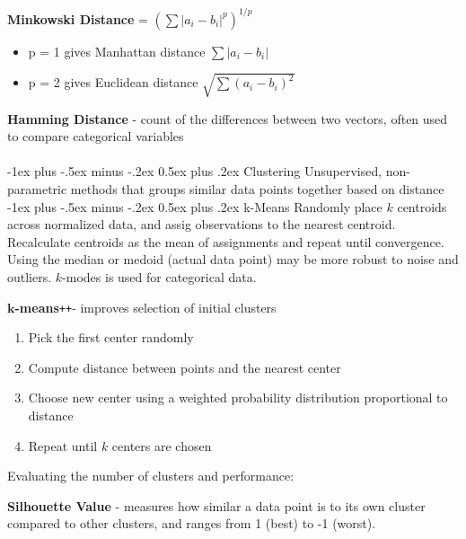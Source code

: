 \documentclass[10pt,landscape]{article}
\makeatletter
\renewcommand{\section}{\@startsection{section}{1}{0mm}%
                                {-1ex plus -.5ex minus -.2ex}%
                                {0.5ex plus .2ex}%
                                {\normalfont\large\bfseries}}
\renewcommand{\subsection}{\@startsection{subsection}{2}{0mm}%
                                {-1ex plus -.5ex minus -.2ex}%
                                {0.5ex plus .2ex}%
                                {\normalfont\normalsize\bfseries}}
\makeatother
\begin{document}
\begin{multicols}{3}
\textbf{Minkowski Distance} = $(\sum|a_i - b_i|^p)^{1/p}$
\begin{itemize}[label={--},leftmargin=4mm]
\itemsep -.4mm 
\item p = 1 gives Manhattan distance ${\sum|a_i - b_i|}$
\item p = 2 gives Euclidean distance $\sqrt{\sum(a_i - b_i)^2}$
\end{itemize}

\textbf{Hamming Distance} - count of the differences between two vectors, often used to compare categorical variables \\

\columnbreak
\textcolor{white}{.}\vspace{-5mm}\\ %
\section{Clustering}
Unsupervised, non-parametric methods that groups similar data points together based on distance
\subsection{k-Means}
Randomly place $k$ centroids across normalized data, and assig observations to the nearest centroid. Recalculate centroids as the mean of assignments and repeat until convergence. Using the median or medoid (actual data point) may be more robust to noise and outliers. $k$-modes is used for categorical data.

\def\Plus{\texttt{+}}
$\boldsymbol{k}$\textbf{-means}\Plus\Plus\hspace{1mm}- improves selection of initial clusters
\begin{enumerate}[leftmargin=5mm]
\itemsep -.4mm 
\item Pick the first center randomly
\item Compute distance between points and the nearest center
\item Choose new center using a weighted probability distribution proportional to distance
\item Repeat until $k$ centers are chosen
\end{enumerate}

Evaluating the number of clusters and performance:

\textbf{Silhouette Value} - measures how similar a data point is to its own cluster compared to other clusters, and ranges from 1 (best) to -1 (worst).


\end{multicols}
\end{document}
